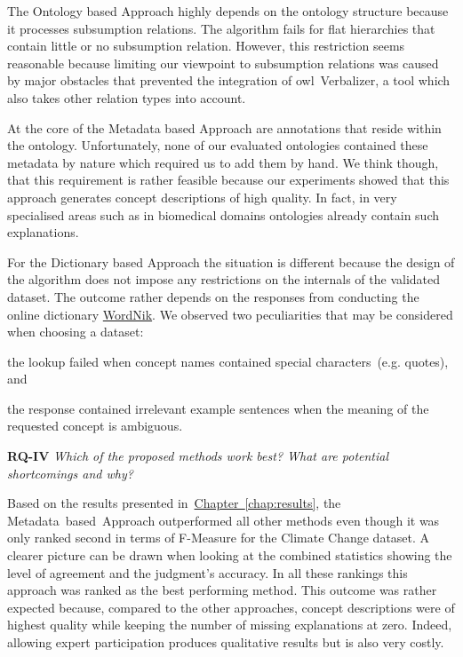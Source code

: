 The Ontology based Approach highly depends on the ontology structure because it processes subsumption relations. The algorithm fails for flat hierarchies that contain little or no subsumption relation. However, this restriction seems reasonable because limiting our viewpoint to subsumption relations was caused by major obstacles that prevented the integration of \gls{owl}~Verbalizer, a tool which also takes other relation types into account. 

At the core of the Metadata based Approach are annotations that reside within the ontology. Unfortunately, none of our evaluated ontologies contained these metadata by nature which required us to add them by hand. We think though, that this requirement is rather feasible because our experiments showed that this approach generates concept descriptions of high quality.  In fact, in very specialised areas such as in biomedical domains ontologies already contain such explanations. 

For the Dictionary based Approach the situation is different because the design of the algorithm does not impose any restrictions on the internals of the validated dataset. The outcome rather depends on the responses from conducting the online dictionary \hyperref[sec:wordnik]{WordNik}. We observed two peculiarities that may be considered when choosing a dataset:
\begin{inparaenum}[i)]
	\item the lookup failed when concept names contained special characters~(e.g. quotes), and
	\item the response contained irrelevant example sentences when the meaning of the requested concept is ambiguous.
\end{inparaenum}


\textbf{RQ-IV} \emph{Which of the proposed methods work best? What are potential shortcomings and why?} 

Based on the results presented in~\hyperref[chap:results]{Chapter~\ref*{chap:results}}, the Metadata~based~Approach outperformed all other methods even though it was only ranked second in terms of F-Measure for the Climate Change dataset. A clearer picture can be drawn when looking at the combined statistics showing the level of agreement and the judgment's accuracy. In all these rankings this approach was ranked as the best performing method. This outcome was rather expected because, compared to the other approaches, concept descriptions were of highest quality while keeping the number of missing explanations at zero. Indeed, allowing expert participation produces qualitative results but is also very costly.  

